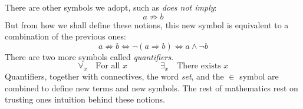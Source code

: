     There are other symbols we adopt, such as \textit{does not imply}:
    \begin{equation*}
        a\not\Rightarrow{b}
    \end{equation*}
    But from how we shall define these notions, this new symbol is equivalent to
    a combination of the previous ones:
    \begin{equation*}
        a\not\Rightarrow{b}\Longleftrightarrow
        \neg(a\Rightarrow{b})
        \Longleftrightarrow
        a\land\neg{b}
    \end{equation*}
    There are two more symbols called
    \textit{\glspl{quantifier}}.
    \begin{equation*}
        \forall_{x}\quad\textrm{For all }x
        \quad\quad\quad\quad
        \exists_{x}\quad\textrm{There exists }x
    \end{equation*}
    Quantifiers, together with connectives, the word \textit{set}, and the
    $\in$ symbol are combined to define new terms and new symbols. The rest of
    mathematics rest on trusting ones intuition behind these notions.